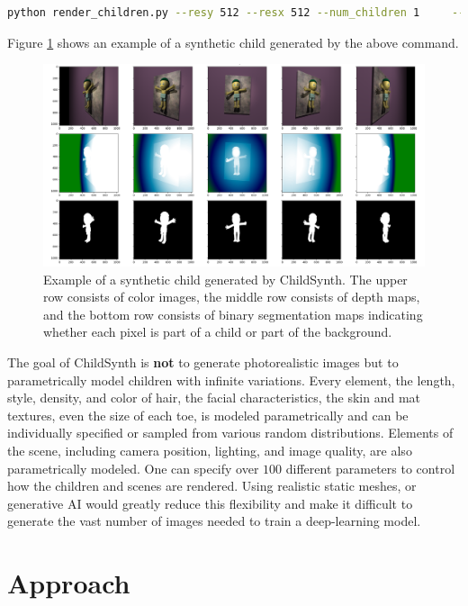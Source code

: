 \documentclass{article}
\begin{document}
\begin{lstlisting}[language=bash]
python render_children.py --resy 512 --resx 512 --num_children 1     --output_dir ./output 
\end{lstlisting}

Figure \ref{fig:child_0} shows an example of a synthetic child generated by the above command.

\begin{figure}[]
    \centering
    \includegraphics[width=\textwidth]{plots/child_0.png}
    \caption{Example of a synthetic child generated by ChildSynth. The upper row consists of color images, the middle row consists of depth maps, and the bottom row consists of binary segmentation maps indicating whether each pixel is part of a child or part of the background.}
    \label{fig:child_0}
\end{figure}

The goal of ChildSynth is \textbf{not} to generate photorealistic images but to parametrically model children with infinite variations. Every element, the length, style, density, and color of hair, the facial characteristics, the skin and mat textures, even the size of each toe, is modeled parametrically and can be individually specified or sampled from various random distributions. Elements of the scene, including camera position, lighting, and image quality, are also parametrically modeled. One can specify over $100$ different parameters to control how the children and scenes are rendered. Using realistic static meshes, or generative AI would greatly reduce this flexibility and make it difficult to generate the vast number of images needed to train a deep-learning model.

\section{Approach}
\end{document}
